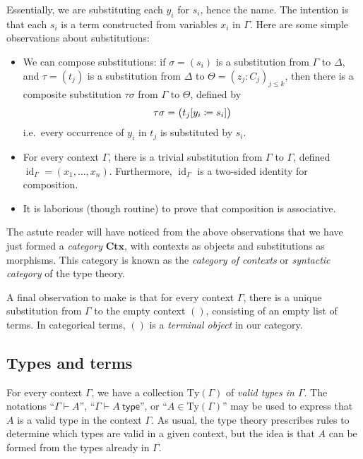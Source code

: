 \documentclass{article}
\theoremstyle{definition}
\newcommand{\proves}{\vdash}
\newcommand{\emp}{()}%
\newcommand{\comp}[2]{#2#1}%
\newcommand{\C}{\mathbf{Ctx}}
\newcommand{\Ty}{\mathrm{Ty}}
\DeclareMathOperator{\id}{id}				    %
\newcommand{\defeq}{
	\mathrel{\mathrel{\mathop:}\mkern-1.2mu=}}	%
\begin{document}
Essentially, we are substituting each $y_i$ for $s_i$, hence the name. The intention is that each $s_i$ is a term constructed from variables $x_i$ in $\Gamma$. Here are some simple observations about substitutions:
\begin{itemize}
    \item We can compose substitutions: if $\sigma = (s_i)$ is a substitution from $\Gamma$ to $\Delta$, and $\tau = (t_j)$ is a substitution from $\Delta$ to $\Theta = (z_j : C_j)_{j \leq k}$, then there is a composite substitution $\comp{\sigma}{\tau}$ from $\Gamma$ to $\Theta$, defined by $$\comp{\sigma}{\tau} = \big( t_j[y_i \defeq s_i] \big)$$
    i.e.\ every occurrence of $y_i$ in $t_j$ is substituted by $s_i$.
    
    \item For every context $\Gamma$, there is a trivial substitution from $\Gamma$ to $\Gamma$, defined $\id_\Gamma = (x_1,\ldots,x_n)$. Furthermore, $\id_\Gamma$ is a two-sided identity for composition.
    
    \item It is laborious (though routine) to prove that composition is associative.
\end{itemize}

The astute reader will have noticed from the above observations that we have just formed a \textit{category} $\C$, with contexts as objects and substitutions as morphisms. This category is known as the \textit{category of contexts} or \textit{syntactic category} of the type theory.
 
A final observation to make is that for every context $\Gamma$, there is a unique substitution from $\Gamma$ to the empty context $\emp$, consisting of an empty list of terms. In categorical terms, $\emp$ is a \textit{terminal object} in our category.



\subsection{Types and terms}
\label{sec:types-terms}

For every context $\Gamma$, we have a collection $\Ty(\Gamma)$ of \textit{valid types in $\Gamma$}. The notations ``$\Gamma \proves A$'', ``$\Gamma \proves A\ \mathsf{type}$'', or ``$A \in \Ty(\Gamma)$'' may be used to express that $A$ is a valid type in the context $\Gamma$. As usual, the type theory prescribes rules to determine which types are valid in a given context, but the idea is that $A$ can be formed from the types already in $\Gamma$.
\end{document}
